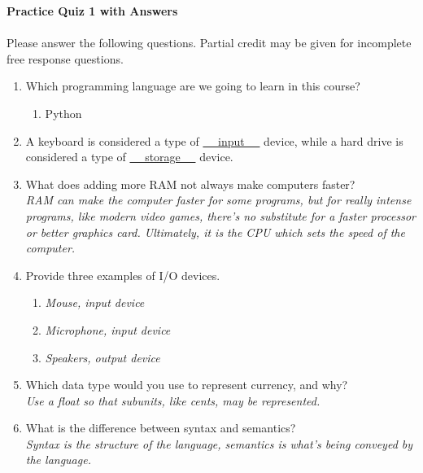 \documentclass[letter,10pt]{article}
\newcommand*\tick{\item[\Checkmark]}
\begin{document}
\huge
\textbf{Practice Quiz 1 with Answers}
\normalsize

\paragraph{}Please answer the following questions. Partial credit may be given for incomplete free response questions.

\begin{enumerate}
    \item Which programming language are we going to learn in this course?
    \begin{enumerate}
        \tick Python
    \end{enumerate}
    
    \item A keyboard is considered a type of \underline{~~ input ~~} device, while a hard drive is considered a type of \underline{~~ storage ~~} device.
    
    \item What does adding more RAM not always make computers faster? \\
    \textit{RAM can make the computer faster for some programs, but for really intense programs, like modern video games, there's no substitute for a faster processor or better graphics card. Ultimately, it is the CPU which sets the speed of the computer.}
    
    \item Provide three examples of I/O devices.
    \begin{enumerate}
        \item \textit{Mouse, input device}
        \item \textit{Microphone, input device}
        \item \textit{Speakers, output device}
    \end{enumerate}
    
    \item Which data type would you use to represent currency, and why? \\
    \textit{Use a float so that subunits, like cents, may be represented.}
    
    \item What is the difference between syntax and semantics? \\
    \textit{Syntax is the structure of the language, semantics is what's being conveyed by the language.}
    

\end{enumerate}
\end{document}
